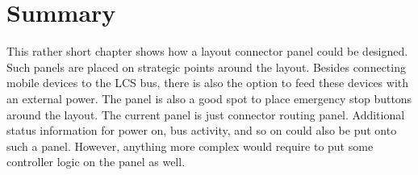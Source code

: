 \begin{figure}[h]
    \centering
\end{figure}

\section{Summary}

This rather short chapter shows how a layout connector panel could be designed. Such panels are placed on strategic points around the layout. Besides connecting mobile devices to the LCS bus, there is also the option to feed these devices with an external power.  The panel is also a good spot to place emergency stop buttons around the layout.  The current panel is just connector routing panel.  Additional status information for power on, bus activity, and so on could also be put onto such a panel. However, anything more complex would require to put some controller logic on the panel as well.

